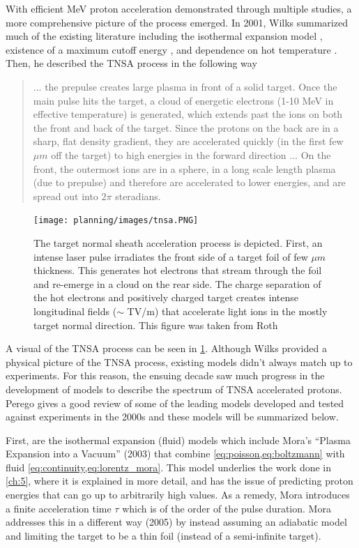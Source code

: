 With efficient MeV proton acceleration demonstrated through multiple studies, a more comprehensive picture of the process emerged. In 2001, Wilks \cite{Wilks_2001_PoP} summarized much of the existing literature including the isothermal expansion model \cite{Crow_1975_JPP}, existence of a maximum cutoff energy \cite{Kishimoto_1983_PoF}, and dependence on hot temperature \cite{Wilks_1992_PRL}. Then, he described the \gls{TNSA} process in the following way \cite{Wilks_2001_PoP}

\begin{quote}
	... the prepulse creates large plasma in front of a solid target. Once the main pulse hits the target, a cloud of energetic electrons (1-10 MeV in effective temperature) is generated, which extends past the ions on both the front and back of the target. Since the protons on the back are in a sharp, flat density gradient, they are accelerated quickly (in the first few $\mu m$ off the target) to high energies in the forward direction ... On the front, the outermost ions are in a sphere, in a long scale length plasma (due to prepulse) and therefore are accelerated to lower energies, and are spread out into $2 \pi$ steradians.
\end{quote}

\begin{figure}
	\centering 
	\texttt{[image: planning/images/tnsa.PNG]}
	\caption{The target normal sheath acceleration process is depicted. First, an intense laser pulse irradiates the front side of a target foil of few $\mu m$ thickness. This generates hot electrons that stream through the foil and re-emerge in a cloud on the rear side. The charge separation of the hot electrons and positively charged target creates intense longitudinal fields ($\sim$ TV/m) that accelerate light ions in the mostly target normal direction. This figure was taken from Roth \cite{Roth_2016_CERN_TNSA}}
	\label{fig:tnsa}
\end{figure}
A visual of the \gls{TNSA} process can be seen in \cref{fig:tnsa}. Although Wilks \cite{Wilks_2001_PoP} provided a physical picture of the \gls{TNSA} process, existing models didn't always match up to experiments. For this reason, the ensuing decade saw much progress in the development of models to describe the spectrum of \gls{TNSA} accelerated protons. Perego \cite{Perego_2011_NIaMiP} gives a good review of some of the leading models developed and tested against experiments in the 2000s and these models will be summarized below. 

First, are the isothermal expansion (fluid) models which include Mora's ``Plasma Expansion into a Vacuum'' \cite{Mora_2003_PRL} (2003) that combine \cref{eq:poisson,eq:boltzmann} with fluid \cref{eq:continuity,eq:lorentz_mora}. This model underlies the work done in \cref{ch:5}, where it is explained in more detail, and has the issue of predicting proton energies that can go up to arbitrarily high values. As a remedy, Mora introduces a finite acceleration time $\tau$ which is of the order of the pulse duration. Mora \cite{Mora_2005_PRE} addresses this in a different way (2005) by instead assuming an adiabatic model and limiting the target to be a thin foil (instead of a semi-infinite target). 

